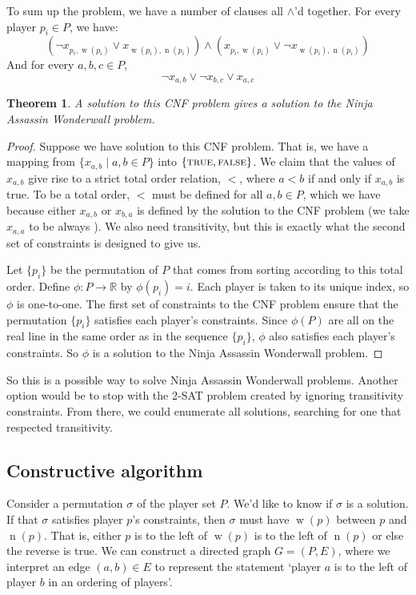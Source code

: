 \documentclass[12pt,x11names, rgb]{article}
\newtheorem*{thm}{Theorem}
\DeclareMathOperator{\w}{w}
\DeclareMathOperator{\n}{n}
\begin{document}
    To sum up the problem, we have a number of clauses all $\wedge$'d together. For every player $p_i \in P$, we have:
\[
	(\lnot x_{p_i, \w(p_i)} \vee x_{\w(p_i), \n(p_i)}) \wedge (x_{p_i, \w(p_i)} \vee \lnot x_{\w(p_i), \n(p_i)})
\]
	And for every $a,b,c \in P$, 
\[
	\lnot x_{a,b} \vee \lnot x_{b,c} \vee x_{a,c}
\]
	\vspace{12pt}
	\begin{thm} A solution to this CNF problem gives a solution to the Ninja Assassin Wonderwall problem. 
	\end{thm}
    \begin{proof}
    Suppose we have solution to this CNF problem. That is, we have a mapping from $\{x_{a,b} \mid a,b \in P\}$ into $\{\textnormal{\scshape true}, \textnormal{\scshape false}\}$. We claim that the values of $x_{a,b}$ give rise to a strict total order relation, $<$, where $a<b$ if and only if $x_{a,b}$ is true. To be a total order, $<$ must be defined for all $a,b \in P$, which we have because either $x_{a,b}$ or $x_{b,a}$ is defined by the solution to the CNF problem (we take $x_{a,a}$ to be always ). We also need transitivity, but this is exactly what the second set of constraints is designed to give us.

    Let $\{p_i\}$ be the permutation of $P$ that comes from sorting according to this total order. Define $\phi: P \to \mathbb{R}$ by $\phi(p_i) = i$. Each player is taken to its unique index, so $\phi$ is one-to-one. The first set of constraints to the CNF problem ensure that the permutation $\{p_i\}$ satisfies each player's constraints. Since $\phi(P)$ are all on the real line in the same order as in the sequence $\{p_i\}$, $\phi$ also satisfies each player's constraints. So $\phi$ is a solution to the Ninja Assassin Wonderwall problem.
    
    \end{proof}

    So this is a possible way to solve Ninja Assassin Wonderwall problems. Another option would be to stop with the 2-SAT problem created by ignoring transitivity constraints. From there, we could enumerate all solutions, searching for one that respected transitivity. %

\subsection{Constructive algorithm}
    \label{sec:algorithm}
    Consider a permutation $\sigma$ of the player set $P$. We'd like to know if $\sigma$ is a solution. If that $\sigma$ satisfies player $p$'s constraints, then $\sigma$ must have $\w(p)$ between $p$ and $\n(p)$. That is, either $p$ is to the left of $\w(p)$ is to the left of $\n(p)$ or else the reverse is true. We can construct a directed graph $G=(P,E)$, where we interpret an edge $(a,b) \in E$ to represent the statement `player $a$ is to the left of player $b$ in an ordering of players'. 
\end{document}
